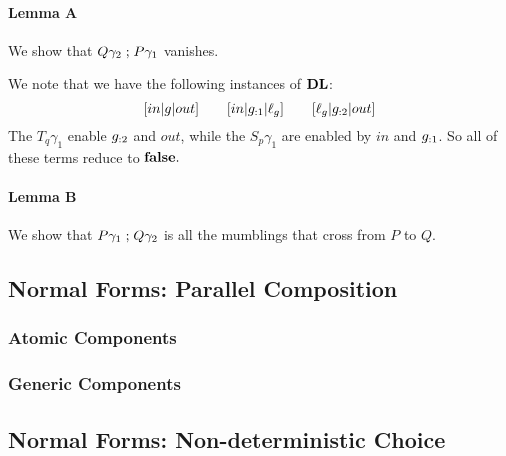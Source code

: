 \paragraph{Lemma A}
We show that $Q\gamma_2\mathrel{;} P\gamma_1$ vanishes.

We note that we have the following instances of $\mathbf{DL}$:
\[
  [in|g|out] \qquad [in|g_{:1}|\ell_g] \qquad [\ell_g|g_{:2}|out]
\]
The $T_q\gamma_1$ enable $g_{:2}$ and $out$,
while the $S_p\gamma_1$ are enabled by $in$ and $g_{:1}$.
So all of these terms reduce to $\mathbf{false}.$

\paragraph{Lemma B}
We show that $P\gamma_1 \mathrel{;} Q\gamma_2$
is all the mumblings that cross from $P$ to $Q$.



\subsection{Normal Forms: Parallel Composition}

\subsubsection{Atomic Components}

\subsubsection{Generic Components}

\subsection{Normal Forms: Non-deterministic Choice}

